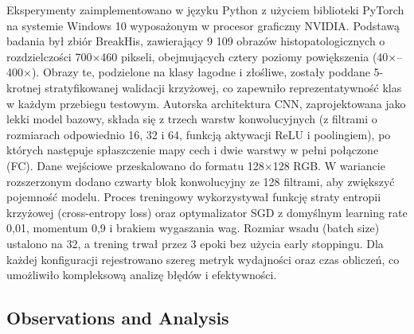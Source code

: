 Eksperymenty zaimplementowano w języku Python z użyciem biblioteki PyTorch na systemie Windows 10 wyposażonym w procesor graficzny NVIDIA. Podstawą badania był zbiór BreakHis, zawierający 9 109 obrazów histopatologicznych o rozdzielczości 700×460 pikseli, obejmujących cztery poziomy powiększenia (40×–400×). Obrazy te, podzielone na klasy łagodne i złośliwe, zostały poddane 5-krotnej stratyfikowanej walidacji krzyżowej, co zapewniło reprezentatywność klas w każdym przebiegu testowym.
Autorska architektura CNN, zaprojektowana jako lekki model bazowy, składa się z trzech warstw konwolucyjnych (z filtrami o rozmiarach odpowiednio 16, 32 i 64, funkcją aktywacji ReLU i poolingiem), po których następuje spłaszczenie mapy cech i dwie warstwy w pełni połączone (FC). Dane wejściowe przeskalowano do formatu 128×128 RGB. W wariancie rozszerzonym dodano czwarty blok konwolucyjny ze 128 filtrami, aby zwiększyć pojemność modelu. Proces treningowy wykorzystywał funkcję straty entropii krzyżowej (cross-entropy loss) oraz optymalizator SGD z domyślnym learning rate 0,01, momentum 0,9 i brakiem wygaszania wag. Rozmiar wsadu (batch size) ustalono na 32, a trening trwał przez 3 epoki bez użycia early stoppingu. Dla każdej konfiguracji rejestrowano szereg metryk wydajności oraz czas obliczeń, co umożliwiło kompleksową analizę błędów i efektywności.

\subsection{Observations and Analysis}

